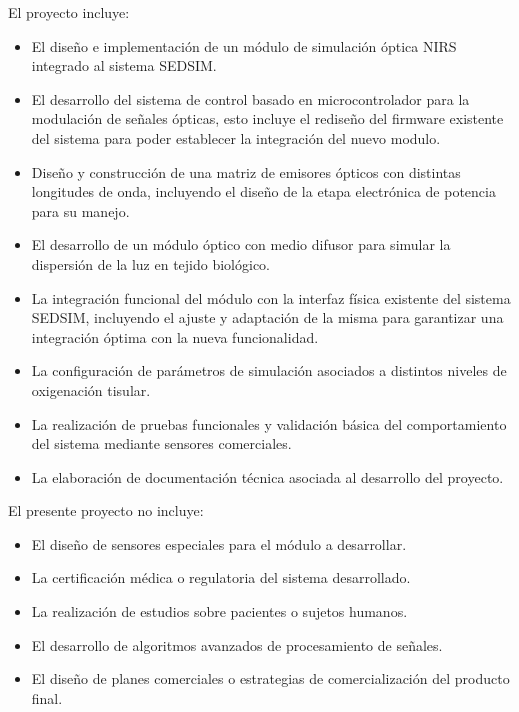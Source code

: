 \documentclass[
11pt, %
]{charter}
\begin{document}
El proyecto incluye:
\begin{itemize}
	\item El diseño e implementación de un módulo de simulación óptica NIRS integrado al sistema SEDSIM.
	
	\item El desarrollo del sistema de control basado en microcontrolador para la modulación de señales ópticas, esto incluye el rediseño del firmware existente del sistema para poder establecer la integración del nuevo modulo.
	
	
	\item Diseño y construcción de una matriz de emisores ópticos con distintas longitudes de onda, incluyendo el diseño de la etapa electrónica de potencia para su manejo.
	
	\item El desarrollo de un módulo óptico con medio difusor para simular la dispersión de la luz en tejido biológico.
	
	\item La integración funcional del módulo con la interfaz física existente del sistema SEDSIM, incluyendo el ajuste y adaptación de la misma para garantizar una integración óptima con la nueva funcionalidad.
	
	\item La configuración de parámetros de simulación asociados a distintos niveles de oxigenación tisular.
	
	\item La realización de pruebas funcionales y validación básica del comportamiento del sistema mediante sensores comerciales.
	
	\item La elaboración de documentación técnica asociada al desarrollo del proyecto.
\end{itemize}

El presente proyecto no incluye:

\begin{itemize}
	\item El diseño de sensores especiales para el módulo a desarrollar.
	
	\item La certificación médica o regulatoria del sistema desarrollado.
	
	\item La realización de estudios sobre pacientes o sujetos humanos.
	
	\item El desarrollo de algoritmos avanzados de procesamiento de señales.
	
	\item El diseño de planes comerciales o estrategias de comercialización del producto final.
\end{itemize}
\end{document}
